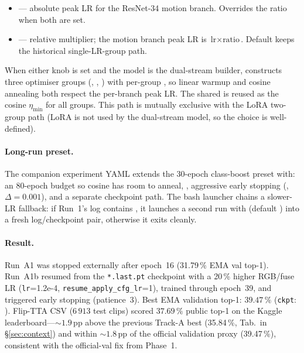 \begin{itemize}[leftmargin=2em]
\item {} --- absolute peak LR for the
   ResNet-34 motion branch.  Overrides the ratio when both are set.
\item {} --- relative multiplier; the
   motion branch peak LR is \(\text{lr}\times\text{ratio}\).  Default
    keeps the historical single-LR-group path.
\end{itemize}

When either knob is set and the model is the dual-stream builder,
 constructs three optimiser groups
(, , ) with
per-group , so linear warmup and cosine annealing
both respect the per-branch peak LR.  The shared  is
reused as the cosine \(\eta_{\min}\) for all groups.  This path is
mutually exclusive with the LoRA two-group path (LoRA is not used by
the dual-stream model, so the choice is well-defined).

\paragraph{Long-run preset.}  The companion experiment YAML
extends the 30-epoch class-boost preset with: an 80-epoch budget so
cosine has room to anneal, , aggressive
early stopping (, \(\Delta=0.001\)),
and a separate checkpoint path.  The bash launcher
 chains a
slower-LR fallback: if Run~1's log contains
, it launches a second run with
 (default ) into a fresh
log/checkpoint pair, otherwise it exits cleanly.

\paragraph{Result.}  Run~A1 was stopped externally after epoch~16
(31.79\,\% EMA val top-1).  Run~A1b resumed from the \texttt{*.last.pt}
checkpoint with a 20\,\% higher RGB/fuse LR (\texttt{lr}=1.2e-4,
\texttt{resume\_apply\_cfg\_lr}=1), trained through epoch~39, and
triggered early stopping (patience~3).  Best EMA validation top-1:
\(\mathbf{39.47\,\%}\) (\texttt{ckpt}: ).
Flip-TTA CSV 
(\(6\,913\) test clips) scored \(\mathbf{37.69\,\%}\) public top-1 on
the Kaggle leaderboard---\(\sim 1.9\)\,pp above the previous Track-A
best (35.84\,\%, Tab.~in \S\ref{sec:context}) and within \(\sim 1.8\)\,pp
of the official validation proxy (39.47\,\%), consistent with the
official-val fix from Phase~1.

